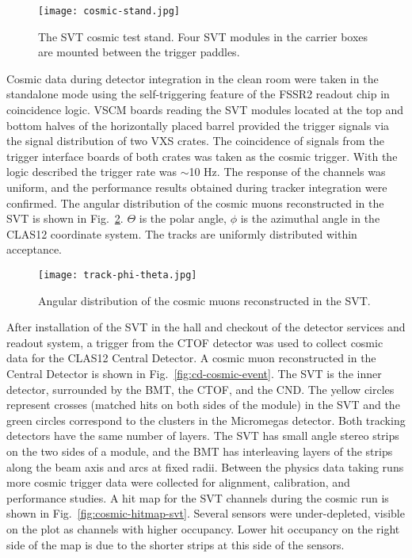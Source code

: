 \begin{figure}[hbt] 
\centering 
\texttt{[image: cosmic-stand.jpg]}
\caption{The SVT cosmic test stand. Four SVT modules in the carrier boxes are mounted between the trigger paddles.}
\label{fig:cosmic-stand}
\end{figure}

Cosmic data during detector integration in the clean room were taken in the standalone mode using the self-triggering feature of the FSSR2 readout chip in coincidence logic. VSCM boards reading the SVT modules located at the top and bottom halves of the horizontally placed barrel provided the trigger signals via the signal distribution of two VXS crates. The coincidence of  signals from the trigger interface boards of both crates was taken as the cosmic trigger. With the logic described the trigger rate was $\sim$10 Hz. The response of the channels was uniform, and the performance results obtained during tracker integration were confirmed. The angular distribution of the cosmic muons reconstructed in the SVT is shown in Fig.~\ref{fig:track-phi-theta}. $\Theta$ is the polar angle, $\phi$ is the azimuthal angle in the CLAS12 coordinate system. The tracks are uniformly distributed within acceptance.

\begin{figure}[hbt] 
\centering 
\texttt{[image: track-phi-theta.jpg]}
\caption{Angular distribution of the cosmic muons reconstructed in the SVT.}
\label{fig:track-phi-theta}
\end{figure}

After installation of the SVT in the hall and checkout of the detector services and readout system, a trigger from the CTOF detector was used to collect cosmic data for the CLAS12 Central Detector. A cosmic muon reconstructed in the Central Detector is shown in Fig.~\ref{fig:cd-cosmic-event}. The SVT is the inner detector, surrounded by the BMT, the CTOF, and the CND. The yellow circles represent crosses (matched hits on both sides of the module) in the SVT and the green circles correspond to the clusters in the Micromegas detector. Both tracking detectors have the same number of layers. The SVT has small angle stereo strips on the two sides of a module, and the BMT has interleaving layers of the strips along the beam axis and arcs at fixed radii. Between the physics data taking runs more cosmic trigger data were collected for alignment, calibration, and performance studies.  A hit map for the SVT channels during the cosmic run is shown in Fig.~\ref{fig:cosmic-hitmap-svt}. Several sensors were under-depleted, visible on the plot as channels with higher occupancy. Lower hit occupancy on the right side of the map is due to the shorter strips at this side of the sensors. 

